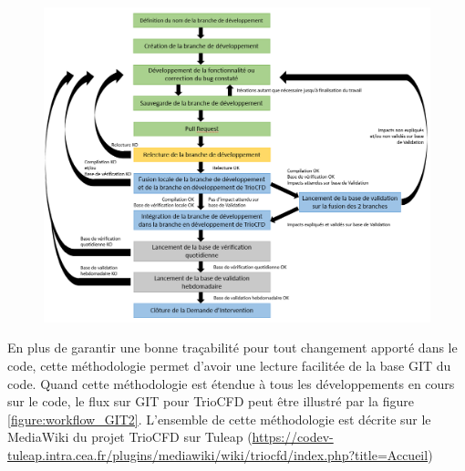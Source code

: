 \begin{figure}[H]
   \centering
   \includegraphics[width=16cm]{pictures/workflow_GIT.png}
   \vspace*{0.2cm}
\end{figure}
\vspace{0.2cm}
En plus de garantir une bonne traçabilité pour tout changement apporté dans le code, cette méthodologie permet d'avoir une lecture facilitée de la base GIT du code. Quand cette méthodologie est étendue à tous les développements en cours sur le code, le flux sur GIT pour TrioCFD peut être illustré par la figure \ref{figure:workflow_GIT2}. L'ensemble de cette méthodologie est décrite sur le MediaWiki du projet TrioCFD sur Tuleap (\url{https://codev-tuleap.intra.cea.fr/plugins/mediawiki/wiki/triocfd/index.php?title=Accueil})\vspace{0.5cm}\\

